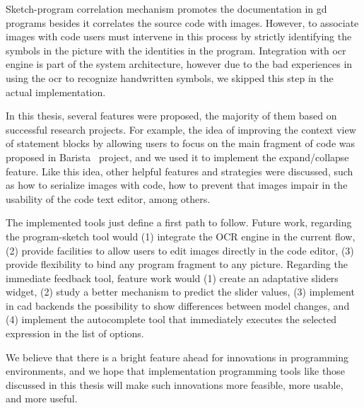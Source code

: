 Sketch-program correlation mechanism promotes the documentation in \gls{gd} programs besides it correlates the source code with images. However, to associate images with code users must intervene in this process by strictly identifying the symbols in the picture with the identities in the program. Integration with \gls{ocr} engine is part of the system architecture, however due to the bad experiences in using the \gls{ocr} to recognize handwritten symbols, we skipped this step in the actual implementation.

In this thesis, several features were proposed, the majority of them based on successful research projects. For example, the idea of improving the context view of statement blocks by allowing users to focus on the main fragment of code was proposed in Barista~\citep{ko2006barista} project, and we used it to implement the expand/collapse feature. Like this idea, other helpful features and strategies were discussed, such as how to serialize images with code, how to prevent that images impair in the usability of the code text editor, among others.

The implemented tools just define a first path to follow.  Future work, regarding the program-sketch tool would (1) integrate the OCR engine in the current flow, (2) provide facilities to allow users to edit images directly in the code editor, (3) provide flexibility to bind any program fragment to any picture. Regarding the immediate feedback tool, feature work would (1) create an adaptative sliders widget, (2) study a better mechanism to predict the slider values, (3) implement in \gls{cad} backends the possibility to show differences between model changes, and (4) implement the autocomplete tool that immediately executes the selected expression in the list of options.

We believe that there is a bright feature ahead for innovations in programming environments, and we hope that implementation programming tools like those discussed in this thesis will make such innovations more feasible, more usable, and more useful.